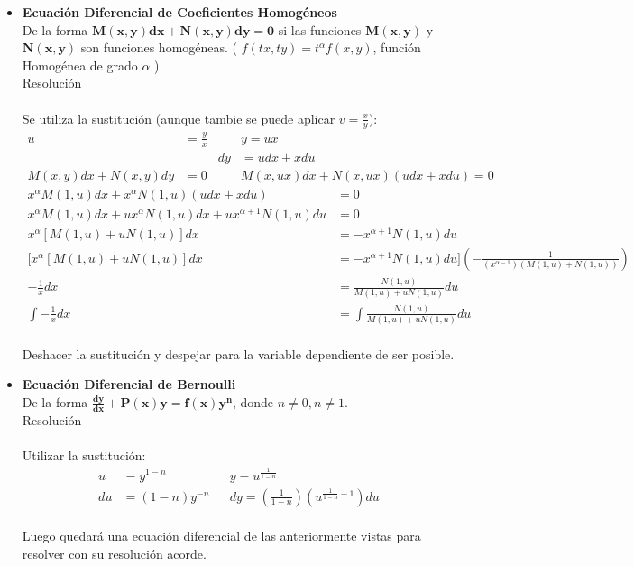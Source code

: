 \documentclass{article}
\begin{document}
\begin{itemize}
    \item \textbf{Ecuación Diferencial de Coeficientes Homogéneos} \\
    De la forma $\boldsymbol{M(x,y)dx + N(x,y)dy = 0}$ 
    si las funciones $\boldsymbol{M(x,y)}$ y $\boldsymbol{N(x,y)}$  son 
    funciones homogéneas. ( $f(tx,ty) = t^{\alpha}f(x,y)$, función Homogénea 
    de grado $\alpha$ ). \\
    Resolución \\
    \\Se utiliza la sustitución (aunque tambie se puede aplicar $v=\frac{x}{y}$): \\
    \begin{align*}
        u & = \frac{y}{x} && y = ux\\
        && dy & = udx + xdu \\
        M(x,y)dx + N(x,y)dy &= 0 && M(x,ux)dx + N(x,ux)(udx +xdu) = 0
    \end{align*}
    \begin{align*}
        x^{\alpha} M(1,u)dx + x^{\alpha} N(1,u)(udx + xdu) & = 0 \\
        x^{\alpha} M(1,u)dx + ux^{\alpha} N(1,u)dx + ux^{\alpha+1} N(1,u)du & = 0 \\
        x^{\alpha} [ M(1,u) + uN(1,u) ]dx & = -x^{\alpha+1}N(1,u)du \\
        [ x^{\alpha} [ M(1,u) + uN(1,u) ]dx & = -x^{\alpha+1}N(1,u)du ] (-\frac{1}{(x^{\alpha-1})(M(1,u)+N(1,u))}) \\
        -\frac{1}{x} dx & = \frac{N(1,u)}{M(1,u) + uN(1,u)}du \\
        \int -\frac{1}{x} dx & = \int \frac{N(1,u)}{M(1,u) + uN(1,u)}du
    \end{align*}
    \\Deshacer la sustitución y despejar para la variable dependiente de ser posible.\\

    \item \textbf{Ecuación Diferencial de Bernoulli} \\
    De la forma $\boldsymbol{\frac{dy}{dx} + P(x)y = f(x)y^n}$, donde 
    $n \neq 0, n \neq 1$. \\
    Resolución \\
    \\ Utilizar la sustitución: \\
    \begin{align*}
        u & = y^{1-n} && y = u^{\frac{1}{1-n}} \\
        du & = (1-n)y^{-n} && dy = (\frac{1}{1-n})(u^{\frac{1}{1-n}-1})du
    \end{align*}
    \\Luego quedará una ecuación diferencial de las anteriormente vistas para resolver con 
    su resolución acorde.


\end{itemize}
\end{document}
